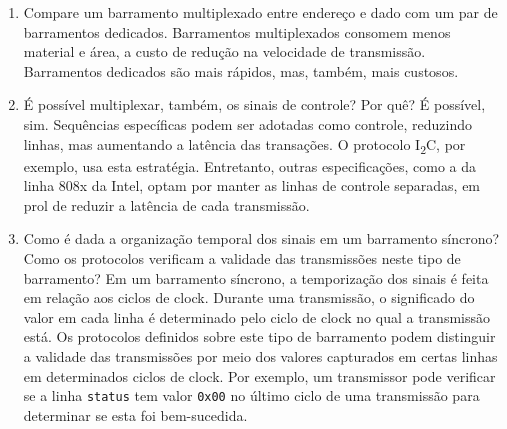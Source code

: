 \documentclass{article}
\begin{document}
\begin{enumerate}
\begin{itemize}
    \item sua leitura retorna valores que devem ser interpretados em ponto fixo;

    \item é inicializado automaticamente, estando pronto para executar quando o programa começa;

    \item ao ser inicializado, está no estado \texttt{aguardando} e o valor em \texttt{leitura} não é válido;

    \item quando uma leitura é inicializada, o valor em \texttt{leitura} só é válido após sua conclusão;

    \item quando uma leitura é concluída, a próxima só pode ser iniciada após \texttt{ctrl} receber \texttt{0}, indicando que o usuário reconhece a sinalização de conclusão;
\end{itemize}
escreva um código MIPS que computa a média de cinco leituras deste periférico.

\url{https://github.com/Eduardo-bat/AOC_2024/blob/main/mmio.asm}

\section*{Tema: barramentos}

\item Compare um barramento multiplexado entre endereço e dado com um par de barramentos dedicados. Barramentos multiplexados consomem menos material e área, a custo de redução na velocidade de transmissão. Barramentos dedicados são mais rápidos, mas, também, mais custosos.

\item É possível multiplexar, também, os sinais de controle? Por quê? É possível, sim. Sequências específicas podem ser adotadas como controle, reduzindo linhas, mas aumentando a latência das transações. O protocolo I\textsubscript{2}C, por exemplo, usa esta estratégia. Entretanto, outras especificações, como a da linha 808x da Intel, optam por manter as linhas de controle separadas, em prol de reduzir a latência de cada transmissão.

\item Como é dada a organização temporal dos sinais em um barramento síncrono? Como os protocolos verificam a validade das transmissões neste tipo de barramento? Em um barramento síncrono, a temporização dos sinais é feita em relação aos ciclos de clock. Durante uma transmissão, o significado do valor em cada linha é determinado pelo ciclo de clock no qual a transmissão está. Os protocolos definidos sobre este tipo de barramento podem distinguir a validade das transmissões por meio dos valores capturados em certas linhas em determinados ciclos de clock. Por exemplo, um transmissor pode verificar se a linha \texttt{status} tem valor \texttt{0x00} no último ciclo de uma transmissão para determinar se esta foi bem-sucedida.


\end{enumerate}
\end{document}
